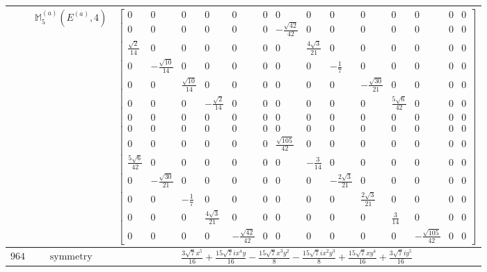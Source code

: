 \documentclass[fleqn,8pt,landscape]{jsarticle}
\begin{document}
\begin{longtable}{ccc}
$  $ & $ \mathbb{M}_{5}^{(a)}(E^{(a)},4) $ & $ \begin{bmatrix} 0 & 0 & 0 & 0 & 0 & 0 & 0 & 0 & 0 & 0 & 0 & 0 & 0 & 0 \\ 0 & 0 & 0 & 0 & 0 & 0 & - \frac{\sqrt{42}}{42} & 0 & 0 & 0 & 0 & 0 & 0 & 0 \\ \frac{\sqrt{2}}{14} & 0 & 0 & 0 & 0 & 0 & 0 & \frac{4 \sqrt{3}}{21} & 0 & 0 & 0 & 0 & 0 & 0 \\ 0 & - \frac{\sqrt{10}}{14} & 0 & 0 & 0 & 0 & 0 & 0 & - \frac{1}{7} & 0 & 0 & 0 & 0 & 0 \\ 0 & 0 & \frac{\sqrt{10}}{14} & 0 & 0 & 0 & 0 & 0 & 0 & - \frac{\sqrt{30}}{21} & 0 & 0 & 0 & 0 \\ 0 & 0 & 0 & - \frac{\sqrt{2}}{14} & 0 & 0 & 0 & 0 & 0 & 0 & \frac{5 \sqrt{6}}{42} & 0 & 0 & 0 \\ 0 & 0 & 0 & 0 & 0 & 0 & 0 & 0 & 0 & 0 & 0 & 0 & 0 & 0 \\ 0 & 0 & 0 & 0 & 0 & 0 & 0 & 0 & 0 & 0 & 0 & 0 & 0 & 0 \\ 0 & 0 & 0 & 0 & 0 & 0 & \frac{\sqrt{105}}{42} & 0 & 0 & 0 & 0 & 0 & 0 & 0 \\ \frac{5 \sqrt{6}}{42} & 0 & 0 & 0 & 0 & 0 & 0 & - \frac{3}{14} & 0 & 0 & 0 & 0 & 0 & 0 \\ 0 & - \frac{\sqrt{30}}{21} & 0 & 0 & 0 & 0 & 0 & 0 & - \frac{2 \sqrt{3}}{21} & 0 & 0 & 0 & 0 & 0 \\ 0 & 0 & - \frac{1}{7} & 0 & 0 & 0 & 0 & 0 & 0 & \frac{2 \sqrt{3}}{21} & 0 & 0 & 0 & 0 \\ 0 & 0 & 0 & \frac{4 \sqrt{3}}{21} & 0 & 0 & 0 & 0 & 0 & 0 & \frac{3}{14} & 0 & 0 & 0 \\ 0 & 0 & 0 & 0 & - \frac{\sqrt{42}}{42} & 0 & 0 & 0 & 0 & 0 & 0 & - \frac{\sqrt{105}}{42} & 0 & 0 \end{bmatrix} $ \\ \hline
$ 964 $ & $ \text{symmetry} $ & $ \frac{3 \sqrt{7} x^{5}}{16} + \frac{15 \sqrt{7} i x^{4} y}{16} - \frac{15 \sqrt{7} x^{3} y^{2}}{8} - \frac{15 \sqrt{7} i x^{2} y^{3}}{8} + \frac{15 \sqrt{7} x y^{4}}{16} + \frac{3 \sqrt{7} i y^{5}}{16} $ \\

\end{longtable}
\end{document}
